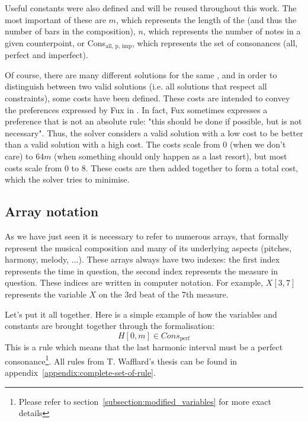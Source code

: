 Useful constants were also defined and will be reused throughout this work. The most important of these are $m$, which represents the length of the \cfs (and thus the number of bars in the composition), $n$, which represents the number of notes in a given counterpoint, or Cons$_{\text{all, p, imp}}$, which represents the set of consonances (all, perfect and imperfect).

Of course, there are many different solutions for the same \cf, and in order to distinguish between two valid solutions (i.e. all solutions that respect all constraints), some costs have been defined. These costs are intended to convey the preferences expressed by Fux in \gap. In fact, Fux sometimes expresses a preference that is not an absolute rule: "this should be done if possible, but is not necessary". Thus, the solver considers a valid solution with a low cost to be better than a valid solution with a high cost. The costs scale from 0 (when we don't care) to 64$m$ (when something should only happen as a last resort), but most costs scale from 0 to 8. These costs are then added together to form a total cost, which the solver tries to minimise.

\subsection{Array notation}
As we have just seen it is necessary to refer to numerous arrays, that formally represent the musical composition and many of its underlying aspects (pitches, harmony, melody, ...). These arrays always have two indexes: the first index represents the time in question, the second index represents the measure in question. These indices are written in computer notation. For example, $X[3, 7]$ represents the variable $X$ on the 3rd beat of the 7th measure.

Let's put it all together. Here is a simple example of how the variables and constants are brought together through the formalisation: 
\begin{equation}    
    H[0, m] \in Cons_{\text{perf}}
\end{equation}
 This is a rule which means that the last harmonic interval must be a perfect consonance\footnote{Please refer to section~\ref{subsection:modified_variables} for more exact details}. All rules from T. Wafflard's thesis can be found in appendix~\ref{appendix:complete-set-of-rule}.

